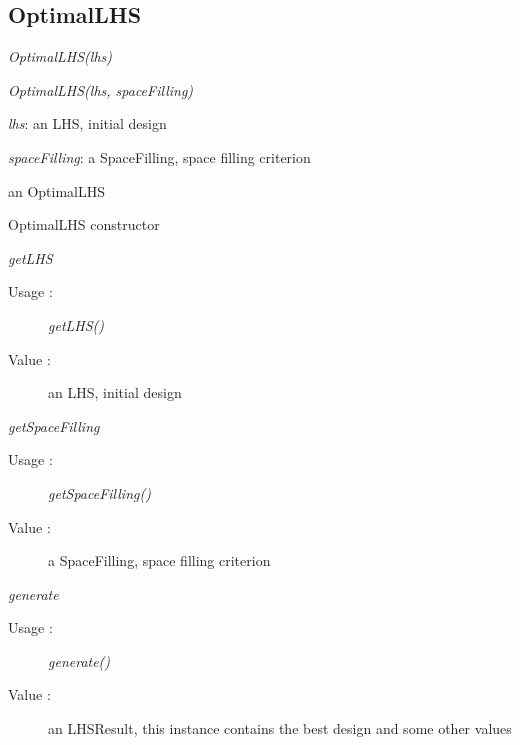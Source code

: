 \subsection{OptimalLHS}
\begin{description}

\item[Usage:] \rule{0pt}{1em}
  \begin{description}
  \item \textit{OptimalLHS(lhs)}
  \item \textit{OptimalLHS(lhs, spaceFilling)}
  \end{description}

\item[Arguments:]  \rule{0pt}{1em}
  \begin{description}
  \item \textit{lhs}: an LHS, initial design
  \item \textit{spaceFilling}: a SpaceFilling, space filling criterion
  \end{description}

\item[Value :] an OptimalLHS

\item[Details :]  \rule{0pt}{1em}
  \begin{description}
  \item OptimalLHS constructor
  \end{description}

\item \textit{getLHS}
  \begin{description}
  \item[Usage :] \textit{getLHS()}
  \item[Value :] an LHS, initial design
  \end{description}

\item \textit{getSpaceFilling}
  \begin{description}
  \item[Usage :] \textit{getSpaceFilling()}
  \item[Value :] a SpaceFilling, space filling criterion
  \end{description}

\item \textit{generate}
  \begin{description}
  \item[Usage :] \textit{generate()}
  \item[Value :] an LHSResult, this instance contains the best design and some other values
  \end{description}

\end{description}

